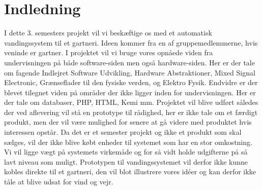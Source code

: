 \chapter{Indledning}

I dette 3. semesters projekt vil vi beskæftige os med et automatisk vandingssystem til et gartneri. Ideen kommer fra en af gruppemedlemmerne, hvis veninde er gartner. I projektet vil vi bruge vores opnåede viden fra undervisningen på både software-siden men også hardware-siden. Her er der tale om fagende Indlejret Software Udvikling, Hardware Abstraktioner, Mixed Signal Electronic, Grænseflader til den fysiske verden, og Elektro Fysik. Endvidre er der blevet tilegnet viden på områder der ikke ligger inden for undervisningen. Her er der tale om databaser, PHP, HTML, Kemi mm. Projektet vil blive udført således der ved aflevering vil stå en prototype til rådighed, her er ikke tale om et færdigt produkt, men der vil være mulighed for senere at gå videre med produktet hvis interessen opstår. Da det er et semester projekt og ikke et produkt som skal sælges, vil der ikke blive købt enheder til systemet som har en stor omkostning. Vi vil ligge vægt på systemets virkemåde og for så vidt holde udgifterne på så lavt niveau som muligt. Prototypen til vandingssystemet vil derfor ikke kunne kobles direkte til et gartneri, den vil blot illustrere vores idéer og kan derfor ikke tåle at blive udsat for vind og vejr. 










   